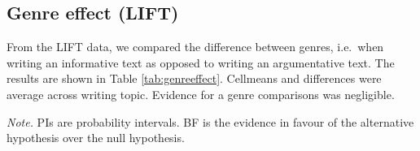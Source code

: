 \documentclass[
  english,
  man,floatsintext]{apa7}
\begin{document}
\begin{appendix}
\section{}
\hypertarget{genre-effect-lift}{%
\subsection{Genre effect (LIFT)}\label{genre-effect-lift}}

From the LIFT data, we compared the difference between genres, i.e.~when
writing an informative text as opposed to writing an argumentative text.
The results are shown in Table \ref{tab:genreeffect}. Cellmeans and
differences were average across writing topic. Evidence for a genre
comparisons was negligible.

\begin{center}
\begin{ThreePartTable}

\begin{TableNotes}[para]
\normalsize{\textit{Note.} PIs are probability intervals. BF is the evidence in favour of the alternative hypothesis over the null hypothesis.}
\end{TableNotes}

\footnotesize{

}
\end{ThreePartTable}
\end{center}
\end{appendix}
\end{document}
